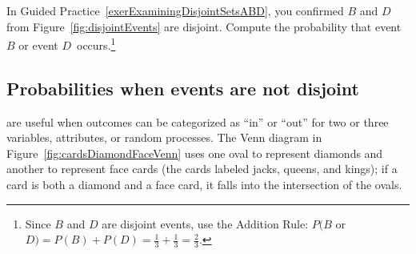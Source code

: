 \begin{exercise}
In Guided Practice~\ref{exerExaminingDisjointSetsABD}, you confirmed $B$ and $D$ from Figure~\ref{fig:disjointEvents} are disjoint. Compute the probability that event $B$ or event $D$~occurs.\footnote{Since $B$ and $D$ are disjoint events, use the Addition Rule: $P(B$ or $D) = P(B) + P(D) = \frac{1}{3} + \frac{1}{3} = \frac{2}{3}$.}
\end{exercise}



\subsection{Probabilities when events are not disjoint}

 are useful when outcomes can be categorized as ``in'' or ``out'' for two or three variables, attributes, or random processes. The Venn diagram in Figure~\ref{fig:cardsDiamondFaceVenn} uses one oval to represent diamonds and another to represent face cards (the cards labeled jacks, queens, and kings); if a card is both a diamond and a face card, it falls into the intersection of the ovals.

